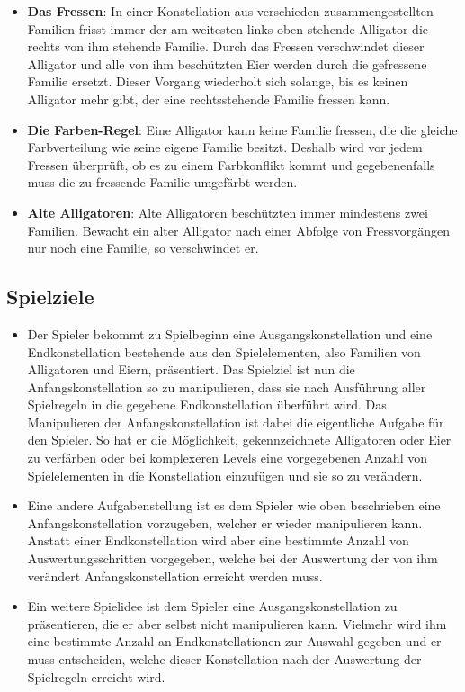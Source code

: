	\begin{itemize}
	
	\item \textbf{Das Fressen}: In einer Konstellation aus verschieden zusammengestellten Familien frisst immer der am weitesten links oben stehende Alligator die rechts von ihm stehende Familie. Durch das Fressen verschwindet dieser Alligator und alle von ihm beschützten Eier werden durch die gefressene Familie ersetzt. Dieser Vorgang wiederholt sich solange, bis es keinen Alligator mehr gibt, der eine rechtsstehende Familie fressen kann.
	
	\item \textbf{Die Farben-Regel}: Eine Alligator kann keine Familie fressen, die die gleiche Farbverteilung wie seine eigene Familie besitzt.  Deshalb wird vor jedem Fressen überprüft, ob es zu einem Farbkonflikt kommt und gegebenenfalls muss die zu fressende Familie umgefärbt werden.
	
	\item \textbf{Alte Alligatoren}: Alte Alligatoren beschützten immer mindestens zwei Familien. Bewacht ein alter Alligator nach einer Abfolge von Fressvorgängen nur noch eine Familie, so verschwindet er.
	
	\end{itemize}	
	
\subsection{Spielziele}
	
	\begin{itemize}
	
		\item Der Spieler bekommt zu Spielbeginn eine Ausgangskonstellation und eine Endkonstellation bestehende aus den Spielelementen, also Familien von Alligatoren und Eiern, präsentiert. Das Spielziel ist nun die Anfangskonstellation so zu manipulieren, dass sie nach Ausführung aller Spielregeln in die gegebene Endkonstellation überführt wird. Das Manipulieren der Anfangskonstellation ist dabei die eigentliche Aufgabe für den Spieler. So hat er die Möglichkeit, gekennzeichnete Alligatoren oder Eier zu verfärben oder bei komplexeren Levels eine vorgegebenen Anzahl von Spielelementen in die Konstellation einzufügen und sie so zu verändern.
		
		\item Eine andere Aufgabenstellung ist es dem Spieler wie oben beschrieben eine Anfangskonstellation vorzugeben, welcher er wieder manipulieren kann. Anstatt einer Endkonstellation wird aber eine bestimmte Anzahl von Auswertungsschritten vorgegeben, welche bei der Auswertung der von ihm verändert Anfangskonstellation erreicht werden muss.
		
		\item Ein weitere Spielidee ist dem Spieler eine Ausgangskonstellation zu präsentieren, die er aber selbst nicht manipulieren kann. Vielmehr wird ihm eine bestimmte Anzahl an Endkonstellationen zur Auswahl gegeben und er muss entscheiden, welche dieser Konstellation nach der Auswertung der Spielregeln erreicht wird.
		
	\end{itemize}

	

